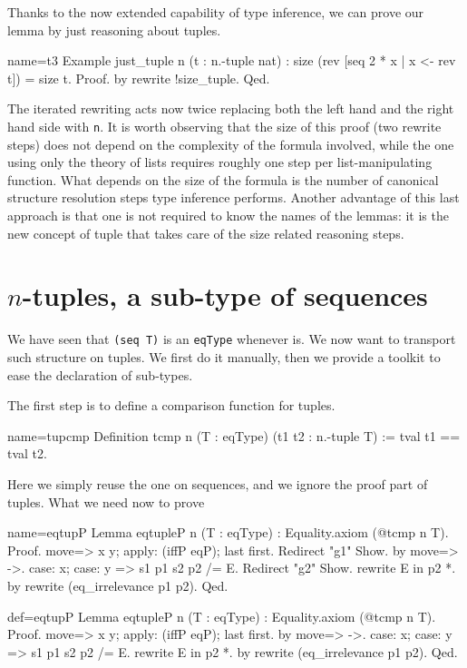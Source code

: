 Thanks to the now extended capability of type inference,
we can prove our lemma by just reasoning about tuples.

\begin{coq}{name=t3}{}
Example just_tuple n (t : n.-tuple nat) :
  size (rev [seq 2 * x | x <- rev t]) = size t.
Proof. by rewrite !size_tuple. Qed.
\end{coq}

The iterated rewriting acts now twice replacing both the left hand
and the right hand side with \lstinline/n/.  It is worth observing
that the size of this proof (two rewrite steps) does not depend on the
complexity of the formula involved, while the one using only the
theory of lists requires roughly one step per list-manipulating function.
What depends on the size of the formula is the number of canonical
structure resolution steps type inference performs.  Another advantage
of this last approach is that one
is not required to know the names of the lemmas:
it is the new concept of tuple that takes care of the size related
reasoning steps.

\section{$n$-tuples, a sub-type of sequences}
\label{sec:subtypekit}

We have seen that \lstinline/(seq T)/ is an \lstinline/eqType/
whenever  is.  We now want to transport such  structure
on tuples.  We first do it manually, then we provide a toolkit
to ease the declaration of sub-types.

The first step is to define a comparison function for tuples.

\begin{coq}{name=tupcmp}{}
Definition tcmp n (T : eqType) (t1 t2 : n.-tuple T) := tval t1 == tval t2.
\end{coq}

Here we simply reuse the one on sequences, and we ignore the
proof part of tuples.  What we need now to prove

\begin{coqdef}{name=eqtupP}
Lemma eqtupleP n (T : eqType) : Equality.axiom (@tcmp n T).
Proof.
move=> x y; apply: (iffP eqP); last first.
Redirect "g1" Show.
  by move=> ->.
case: x; case: y => s1 p1 s2 p2 /= E. Redirect "g2" Show.
rewrite E in p2 *.
by rewrite (eq_irrelevance p1 p2).
Qed.
\end{coqdef}
\begin{coq}{def=eqtupP}{}
Lemma eqtupleP n (T : eqType) : Equality.axiom (@tcmp n T).
Proof.
move=> x y; apply: (iffP eqP); last first.
  by move=> ->.
case: x; case: y => s1 p1 s2 p2 /= E.
rewrite E in p2 *.
by rewrite (eq_irrelevance p1 p2).
Qed.
\end{coq}


